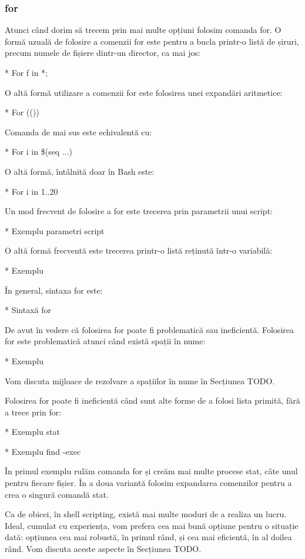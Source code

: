 \subsubsection{for}
\label{sec:auto-func-flux-for}

Atunci când dorim să trecem prin mai multe opțiuni folosim comanda for. O formă
uzuală de folosire a comenzii for este pentru a bucla printr-o listă de șiruri,
precum numele de fișiere dintr-un director, ca mai jos:

* For f in *;

O altă formă utilizare a comenzii for este folosirea unei expandări aritmetice:

* For (())

Comanda de mai sus este echivalentă cu:

* For i in \$(seq ...)

O altă formă, întâlnită doar în Bash este:

* For i in {1..20}

Un mod frecvent de folosire a for este trecerea prin parametrii unui script:

* Exemplu parametri script

O altă formă frecventă este trecerea printr-o listă reținută într-o variabilă:

* Exemplu

În general, sintaxa for este:

* Sintaxă for

De avut în vedere că folosirea for poate fi problematică sau ineficientă.
Folosirea for este problematică atunci când există spații în nume:

* Exemplu

Vom discuta mijloace de rezolvare a spațiilor în nume în Secțiunea TODO.

Folosirea for poate fi ineficientă când sunt alte forme de a folosi lista
primită, fără a trece prin for:

* Exemplu stat

* Exemplu find -exec

În primul exemplu rulăm comanda for și creăm mai multe procese stat, câte unul
pentru fiecare fișier. În a doua variantă folosim expandarea comenzilor pentru a
crea o singură comandă stat.

Ca de obicei, în shell scripting, există mai multe moduri de a realiza un lucru.
Ideal, cumulat cu experiența, vom prefera cea mai bună opțiune pentru o situație
dată: opțiunea cea mai robustă, în primul rând, și cea mai eficientă, în al
doilea rând. Vom discuta aceste aspecte în Secțiunea TODO.


